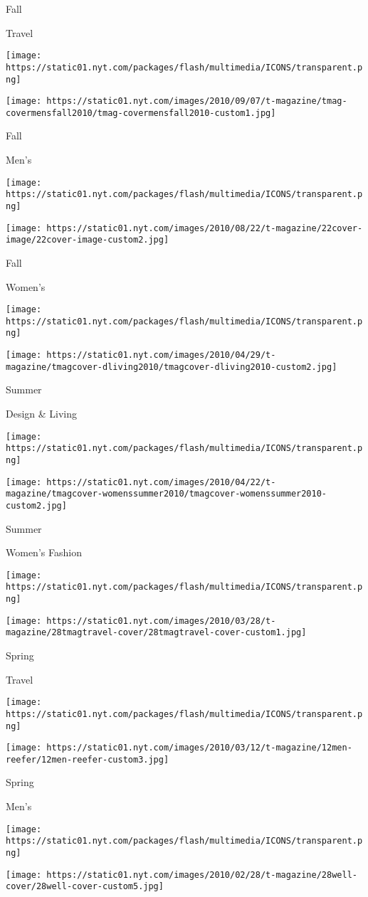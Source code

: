 Fall

Travel

\texttt{[image: https://static01.nyt.com/packages/flash/multimedia/ICONS/transparent.png]}

\texttt{[image: https://static01.nyt.com/images/2010/09/07/t-magazine/tmag-covermensfall2010/tmag-covermensfall2010-custom1.jpg]}

Fall

Men's

\texttt{[image: https://static01.nyt.com/packages/flash/multimedia/ICONS/transparent.png]}

\texttt{[image: https://static01.nyt.com/images/2010/08/22/t-magazine/22cover-image/22cover-image-custom2.jpg]}

Fall

Women's

\texttt{[image: https://static01.nyt.com/packages/flash/multimedia/ICONS/transparent.png]}

\texttt{[image: https://static01.nyt.com/images/2010/04/29/t-magazine/tmagcover-dliving2010/tmagcover-dliving2010-custom2.jpg]}

Summer

Design \& Living

\texttt{[image: https://static01.nyt.com/packages/flash/multimedia/ICONS/transparent.png]}

\texttt{[image: https://static01.nyt.com/images/2010/04/22/t-magazine/tmagcover-womenssummer2010/tmagcover-womenssummer2010-custom2.jpg]}

Summer

Women's Fashion

\texttt{[image: https://static01.nyt.com/packages/flash/multimedia/ICONS/transparent.png]}

\texttt{[image: https://static01.nyt.com/images/2010/03/28/t-magazine/28tmagtravel-cover/28tmagtravel-cover-custom1.jpg]}

Spring

Travel

\texttt{[image: https://static01.nyt.com/packages/flash/multimedia/ICONS/transparent.png]}

\texttt{[image: https://static01.nyt.com/images/2010/03/12/t-magazine/12men-reefer/12men-reefer-custom3.jpg]}

Spring

Men's

\texttt{[image: https://static01.nyt.com/packages/flash/multimedia/ICONS/transparent.png]}

\texttt{[image: https://static01.nyt.com/images/2010/02/28/t-magazine/28well-cover/28well-cover-custom5.jpg]}

